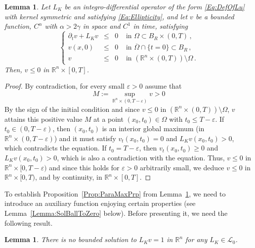 \documentclass[12pt,reqno]{amsart}
\newtheorem{lemma}[theorem]{Lemma}
\theoremstyle{definition}
\theoremstyle{remark}
\newcommand{\con}[1]{\mathbb{#1}}
\newcommand{\R}{\con{R}} %
\newcommand{\lcal}{\mathcal{L}}
\newcommand{\s}{\gamma}
\newcommand\beqc[1]{\left\{\begin{array}{#1}}
\newcommand\eeqc{\end{array} \right.}
\def\PDEsystem{rcll}
\numberwithin{equation}{section}
\begin{document}
\begin{lemma}
	\label{Lemma:ParabolicmaxPrpBdd}
	Let $L_K$ be an integro-differential operator of the form \eqref{Eq:DefOfLu} with kernel symmetric and satisfying \eqref{Eq:Ellipticity}, and let $v$ be a bounded function, $C^\alpha$ with $\alpha > 2\s$ in space and $C^1$ in time, satisfying
	\begin{equation*}
	\beqc{\PDEsystem}
	\partial_t v + L_K v &\leq& 0 & \textrm{ in } \Omega \subset B_R\times(0,T)\,,\\
	v(x,0) &\leq& 0 & \textrm{ in } \overline{\Omega} \cap \{t=0\} \subset B_R\,,\\
	v &\leq& 0 & \textrm{ in } ( \R^n \times (0,T))\setminus \Omega \,.
	\eeqc
	\end{equation*}
	Then, $v\leq 0$ in $\R^n\times [0,T]$.
\end{lemma}

\begin{proof}
	By contradiction, for every small $\varepsilon > 0$ assume that 
	$$
	M:=\sup_{\R^n \times (0,T-\varepsilon)}v > 0
	$$
	By the sign of the initial condition and since $v \leq 0 $ in $(\R^n \times (0,T))\setminus \Omega$, $v$  attains this positive value $M$ at a point $(x_0,t_0) \in \Omega$ with $t_0\leq T-\varepsilon$. If $t_0\in(0,T-\varepsilon)$, then $(x_0,t_0)$ is an interior global maximum (in $\R^n \times (0,T-\varepsilon)$) and it must satisfy $v_t(x_0,t_0)=0$ and $L_K v(x_0,t_0)>0$, which contradicts the equation. If $t_0 = T-\varepsilon$, then $v_t(x_0,t_0)\geq 0$ and $L_K v(x_0,t_0)>0$, which is also a contradiction with the equation. Thus, $v\leq 0$ in $\R^n\times [0,T-\varepsilon)$ and since this holds for $\varepsilon>0$ arbitrarily small, we deduce $v\leq 0$ in $\R^n\times [0,T)$, and by continuity, in $\R^n\times [0,T]$.
\end{proof}

To establish Proposition~\ref{Prop:ParaMaxPrp} from Lemma~\ref{Lemma:ParabolicmaxPrpBdd}, we need to introduce an auxiliary function enjoying certain properties (see Lemma~\ref{Lemma:SolBallToZero} below). Before presenting it, we need the following result.

\begin{lemma}
	\label{Lemma:NoBddSolL=1}
	There is no bounded solution to $L_K v=1$ in $\R^n$ for any $L_K \in \lcal_0$.
\end{lemma}
\end{document}
